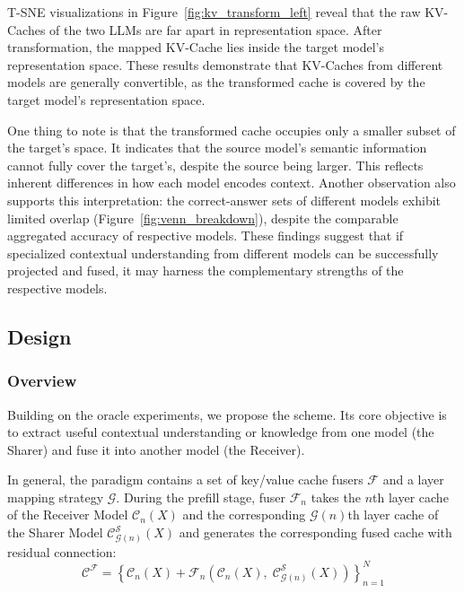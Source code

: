 T-SNE visualizations in Figure~\ref{fig:kv_transform_left} reveal that the raw KV-Caches of the two LLMs are far apart in representation space. After transformation, the mapped KV-Cache lies inside the target model's representation space. These results demonstrate that KV-Caches from different models are generally convertible, as the transformed cache is covered by the target model's representation space.

One thing to note is that the transformed cache occupies only a smaller subset of the target's space. It indicates that the source model's semantic information cannot fully cover the target's, despite the source being larger. This reflects inherent differences in how each model encodes context. 
Another observation also supports this interpretation: the correct-answer sets of different models exhibit limited overlap (Figure~\ref{fig:venn_breakdown}), despite the comparable aggregated accuracy of respective models. 
These findings suggest that if specialized contextual understanding from different models can be successfully projected and fused, it may harness the complementary strengths of the respective models.

\subsection{\name Design}
\label{sec:C2C}

\subsubsection{Overview}
\label{sec:C2C/scheme}
Building on the oracle experiments, we propose the \name scheme. Its core objective is to extract useful contextual understanding or knowledge from one model (the Sharer) and fuse it into another model (the Receiver). 

In general, the \name paradigm contains a set of key/value cache fusers $\mathcal{F}$ and a layer mapping strategy $\mathcal{G}$. 
During the prefill stage, fuser $\mathcal{F}_{n}$ takes the $n$th layer cache of the Receiver Model $\mathcal{C}_{n}(X)$ and the corresponding $\mathcal{G}(n)$th layer cache of the Sharer Model $\mathcal{C}^{\mathcal{S}}_{\mathcal{G}(n)}(X)$ and generates the corresponding fused cache with residual connection:
\begin{equation}
    \mathcal{C}^{\mathcal{F}} 
    = \left\{
        \mathcal{C}_n(X) +
        \mathcal{F}_{n}\!\left(
            \mathcal{C}_{n}(X),\;
            \mathcal{C}^{\mathcal{S}}_{\mathcal{G}(n)}(X)
        \right)
    \right\}_{n=1}^{N}
\end{equation}


